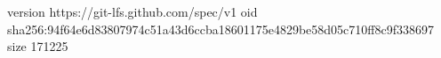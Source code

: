 version https://git-lfs.github.com/spec/v1
oid sha256:94f64e6d83807974c51a43d6ccba18601175e4829be58d05c710ff8c9f338697
size 171225

